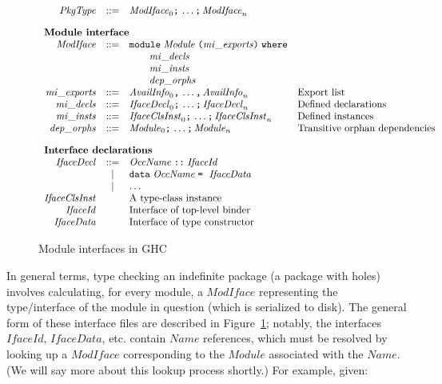 \documentclass{article}
\newcommand{\I}[1]{\ensuremath{\mathit{#1}}}
\begin{document}
\begin{figure}[htpb]
$$
\begin{array}{rcll}
\I{PkgType} & ::= & \I{ModIface}_0 \verb|;|\, \ldots\verb|;|\, \I{ModIface}_n \\[1em]
\multicolumn{3}{l}{\mbox{\bf Module interface}} \\
\I{ModIface} & ::= & \verb|module| \; \I{Module} \; \verb|(| \I{mi\_exports} \verb|)| \; \verb|where| \\
& & \qquad \I{mi\_decls} \\
& & \qquad \I{mi\_insts} \\
& & \qquad \I{dep\_orphs} \\
\I{mi\_exports} & ::= & \I{AvailInfo}_0 \verb|,|\, \ldots \verb|,|\, \I{AvailInfo}_n & \mbox{Export list} \\
\I{mi\_decls} & ::= & \I{IfaceDecl}_0 \verb|;|\, \ldots \verb|;|\, \I{IfaceDecl}_n & \mbox{Defined declarations} \\
\I{mi\_insts} & ::= & \I{IfaceClsInst}_0 \verb|;|\, \ldots \verb|;|\, \I{IfaceClsInst}_n & \mbox{Defined instances} \\
\I{dep\_orphs} & ::= & \I{Module}_0 \verb|;|\, \ldots \verb|;|\, \I{Module}_n & \mbox{Transitive orphan dependencies} \\[1em]
\multicolumn{3}{l}{\mbox{\bf Interface declarations}} \\
\I{IfaceDecl} & ::= & \I{OccName} \; \verb|::| \; \I{IfaceId} \\
              & |   & \verb|data| \; \I{OccName} \; \verb|=| \;\ \I{IfaceData} \\
              & |   & \ldots \\
\I{IfaceClsInst} & & \mbox{A type-class instance} \\
\I{IfaceId} & & \mbox{Interface of top-level binder} \\
\I{IfaceData} & & \mbox{Interface of type constructor} \\
\end{array}
$$
\caption{Module interfaces in GHC} \label{fig:typecheck}
\end{figure}

In general terms,
type checking an indefinite package (a package with holes) involves
calculating, for every module, a \I{ModIface} representing the
type/interface of the module in question (which is serialized
to disk).  The general form of these
interface files are described in Figure~\ref{fig:typecheck}; notably,
the interfaces \I{IfaceId}, \I{IfaceData}, etc. contain \I{Name} references,
which must be resolved by
looking up a \I{ModIface} corresponding to the \I{Module} associated
with the \I{Name}. (We will say more about this lookup process shortly.)
For example, given:
\end{document}
